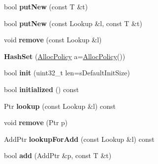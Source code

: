 \begin{DoxyCompactItemize}
\item 
\hypertarget{classjs_1_1_hash_set_acce2fc6e44676bda01ba9ba814f551c0}{bool {\bfseries put\-New} (const T \&t)}\label{classjs_1_1_hash_set_acce2fc6e44676bda01ba9ba814f551c0}

\item 
\hypertarget{classjs_1_1_hash_set_a4259a9b022ac4021facdee28ba6cdcd1}{bool {\bfseries put\-New} (const Lookup \&l, const T \&t)}\label{classjs_1_1_hash_set_a4259a9b022ac4021facdee28ba6cdcd1}

\item 
\hypertarget{classjs_1_1_hash_set_a29d585fbd24b5623c88c0c74d2413f29}{void {\bfseries remove} (const Lookup \&l)}\label{classjs_1_1_hash_set_a29d585fbd24b5623c88c0c74d2413f29}

\item 
\hypertarget{classjs_1_1_hash_set_ab7de2c02a232efe1251293890d701b1e}{{\bfseries Hash\-Set} (\hyperlink{class_alloc_policy}{Alloc\-Policy} a=\hyperlink{class_alloc_policy}{Alloc\-Policy}())}\label{classjs_1_1_hash_set_ab7de2c02a232efe1251293890d701b1e}

\item 
\hypertarget{classjs_1_1_hash_set_aba80e6d44bc36f976720c90cf1be14f5}{bool {\bfseries init} (uint32\-\_\-t len=s\-Default\-Init\-Size)}\label{classjs_1_1_hash_set_aba80e6d44bc36f976720c90cf1be14f5}

\item 
\hypertarget{classjs_1_1_hash_set_a04e8b0ba843cd722987a83916d1d8773}{bool {\bfseries initialized} () const }\label{classjs_1_1_hash_set_a04e8b0ba843cd722987a83916d1d8773}

\item 
\hypertarget{classjs_1_1_hash_set_add2d2158166963f0a1fdee54bac62beb}{Ptr {\bfseries lookup} (const Lookup \&l) const }\label{classjs_1_1_hash_set_add2d2158166963f0a1fdee54bac62beb}

\item 
\hypertarget{classjs_1_1_hash_set_af1dd16e7f11f656e095da05481f2df86}{void {\bfseries remove} (Ptr p)}\label{classjs_1_1_hash_set_af1dd16e7f11f656e095da05481f2df86}

\item 
\hypertarget{classjs_1_1_hash_set_a22e1d1fad858bb5c03a0df4316a4d682}{Add\-Ptr {\bfseries lookup\-For\-Add} (const Lookup \&l) const }\label{classjs_1_1_hash_set_a22e1d1fad858bb5c03a0df4316a4d682}

\item 
\hypertarget{classjs_1_1_hash_set_a9cdd5913290af74fd2f2180c4b8fd7fd}{bool {\bfseries add} (Add\-Ptr \&p, const T \&t)}\label{classjs_1_1_hash_set_a9cdd5913290af74fd2f2180c4b8fd7fd}


\end{DoxyCompactItemize}
